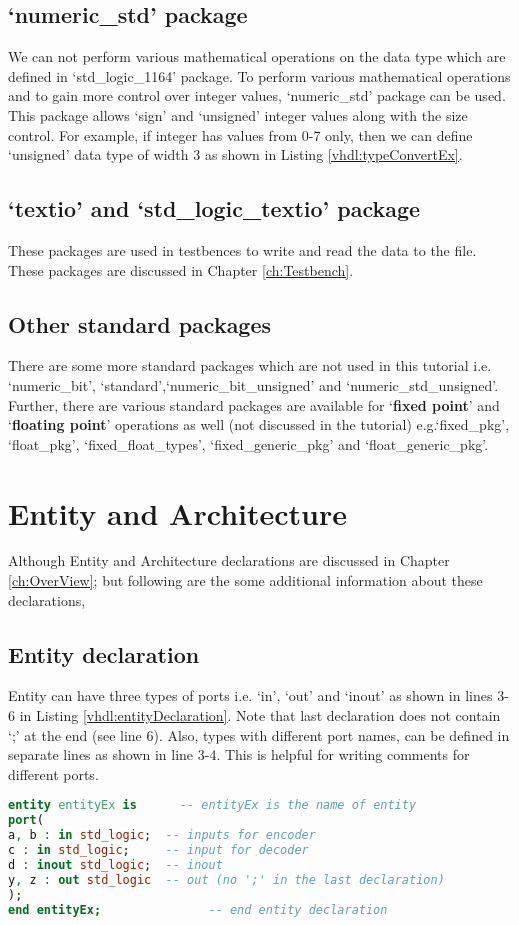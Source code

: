 \subsection{`numeric\_std' package}
We can not perform various mathematical operations on the data type which are defined in `std\_logic\_1164' package. To perform various mathematical operations and to gain more control over integer values, `numeric\_std' package can be used. This package allows `sign' and `unsigned' integer values along with the size control. For example, if integer has values from 0-7 only, then we can define `unsigned' data type of width 3 as shown in Listing \ref{vhdl:typeConvertEx}.

\subsection{`textio' and `std\_logic\_textio' package} 
These packages are used in testbences to write and read the data to the file. These packages are discussed in Chapter \ref{ch:Testbench}.

\subsection{Other standard packages}
There are some more standard packages which are not used in this tutorial i.e. `numeric\_bit', `standard',`numeric\_bit\_unsigned' and `numeric\_std\_unsigned'. Further, there are various standard packages are available for `\textbf{fixed point}' and `\textbf{floating point}' operations as well (not discussed in the tutorial) e.g.`fixed\_pkg', `float\_pkg', `fixed\_float\_types', `fixed\_generic\_pkg' and `float\_generic\_pkg'. 

\section{Entity and Architecture}
Although Entity and Architecture declarations are discussed in Chapter \ref{ch:OverView}; but following are the some additional information about these declarations, 

\subsection{Entity declaration}
Entity can have three types of ports i.e. `in', `out' and `inout' as shown in lines 3-6 in Listing \ref{vhdl:entityDeclaration}. Note that last declaration does not contain `;' at the end (see line 6). Also, types with different port names, can be defined in separate lines as shown in line 3-4. This is helpful for writing comments for different ports. 
\begin{lstlisting}[language=Vhdl, caption={Entity Declaration}, label= {vhdl:entityDeclaration}]
entity entityEx is      -- entityEx is the name of entity
port(
a, b : in std_logic;  -- inputs for encoder
c : in std_logic;     -- input for decoder
d : inout std_logic;  -- inout
y, z : out std_logic  -- out (no ';' in the last declaration)
); 
end entityEx; 			    -- end entity declaration 
\end{lstlisting}

